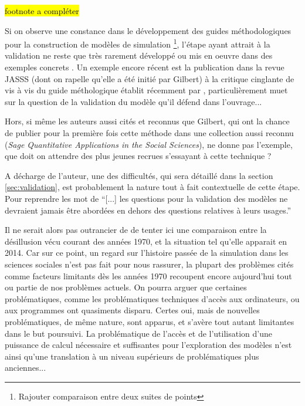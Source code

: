 \hl{footnote a compléter}

Si on observe une constance dans le développement des guides méthodologiques pour la construction de modèles de simulation \footnote{Rajouter comparaison entre deux suites de points}, l'étape ayant attrait à la validation ne reste que très rarement développé ou mis en oeuvre dans des exemples concrets . Un exemple encore récent est la publication dans la revue JASSS (dont on rapelle qu'elle a été initié par Gilbert) à la critique cinglante de \autocite{Manzo2007a} vis à vis du guide méthologique établit récemment par \autocite{Gilbert2008}, particulièrement muet sur la question de la validation du modèle qu'il défend dans l'ouvrage... 

Hors, si même les auteurs aussi cités et reconnus que Gilbert, qui ont la chance de publier pour la première fois cette méthode dans une collection aussi reconnu (\textit{Sage Quantitative Applications in the Social Sciences}), ne donne pas l'exemple, que doit on attendre des plus jeunes recrues s'essayant à cette technique ?

A décharge de l'auteur, une des difficultés, qui sera détaillé dans la section \ref{sec:validation}, est probablement la nature tout à fait contextuelle de cette étape. Pour reprendre les mot de \textcite{Amblard2006} \enquote{[...] les questions pour  la validation des modèles ne devraient jamais être abordées en dehors des questions relatives à leurs usages.}

Il ne serait alors pas outrancier de de tenter ici une comparaison entre la désillusion vécu courant des années 1970, et la situation tel qu'elle apparait en 2014. Car sur ce point, un regard sur l'histoire passée de la simulation dans les sciences sociales n'est pas fait pour nous rassurer, la plupart des problèmes cités comme facteurs limitants dès les années 1970 recoupent encore aujourd'hui tout ou partie de nos problèmes actuels. On pourra arguer que certaines problématiques, comme les problématiques techniques d'accès aux ordinateurs, ou aux programmes ont quasiments disparu. Certes oui, mais de nouvelles problématiques, de même nature, sont apparus, et s'avère tout autant limitantes dans le but poursuivi. La problématique de l'accès et de l'utilisation d'une puissance de calcul nécessaire et suffisantes pour l'exploration des modèles n'est ainsi qu'une translation à un niveau supérieurs de problématiques plus anciennes...

